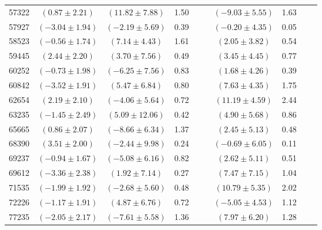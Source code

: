 \documentclass [10pt, twoside] {uwthesis}[2012/04/02]
\begin{document}
{\begin{longtable}[t]{|c|c|cccc|cccc|}
57322	&  $(	0.87	  \pm  	2.21	)$  &  $(	11.82	  \pm  	7.88	)$  &  	1.50	  &  		  &  		  &  $(	-9.03	  \pm  	5.55	)$  &  	1.63	  &  		  &  		  \\
57927	&  $(	-3.04	  \pm  	1.94	)$  &  $(	-2.19	  \pm  	5.69	)$  &  	0.39	  &  		  &  		  &  $(	-0.20	  \pm  	4.35	)$  &  	0.05	  &  		  &  		  \\
58523	&  $(	-0.56	  \pm  	1.74	)$  &  $(	7.14	  \pm  	4.43	)$  &  	1.61	  &  		  &  		  &  $(	2.05	  \pm  	3.82	)$  &  	0.54	  &  		  &  		  \\
59445	&  $(	2.44	  \pm  	2.20	)$  &  $(	3.70	  \pm  	7.56	)$  &  	0.49	  &  		  &  		  &  $(	3.45	  \pm  	4.45	)$  &  	0.77	  &  		  &  		  \\
60252	&  $(	-0.73	  \pm  	1.98	)$  &  $(	-6.25	  \pm  	7.56	)$  &  	0.83	  &  		  &  		  &  $(	1.68	  \pm  	4.26	)$  &  	0.39	  &  		  &  		  \\
60842	&  $(	-3.52	  \pm  	1.91	)$  &  $(	5.47	  \pm  	6.84	)$  &  	0.80	  &  		  &  		  &  $(	7.63	  \pm  	4.35	)$  &  	1.75	  &  		  &  		  \\
62654	&  $(	2.19	  \pm  	2.10	)$  &  $(	-4.06	  \pm  	5.64	)$  &  	0.72	  &  		  &  		  &  $(	11.19	  \pm  	4.59	)$  &  	2.44	  &  		  &  		  \\
63235	&  $(	-1.45	  \pm  	2.49	)$  &  $(	5.09	  \pm  	12.06	)$  &  	0.42	  &  		  &  		  &  $(	4.90	  \pm  	5.68	)$  &  	0.86	  &  		  &  		  \\
65665	&  $(	0.86	  \pm  	2.07	)$  &  $(	-8.66	  \pm  	6.34	)$  &  	1.37	  &  		  &  		  &  $(	2.45	  \pm  	5.13	)$  &  	0.48	  &  		  &  		  \\
68390	&  $(	3.51	  \pm  	2.00	)$  &  $(	-2.44	  \pm  	9.98	)$  &  	0.24	  &  		  &  		  &  $(	-0.69	  \pm  	6.05	)$  &  	0.11	  &  		  &  		  \\
69237	&  $(	-0.94	  \pm  	1.67	)$  &  $(	-5.08	  \pm  	6.16	)$  &  	0.82	  &  		  &  		  &  $(	2.62	  \pm  	5.11	)$  &  	0.51	  &  		  &  		  \\
69612	&  $(	-3.36	  \pm  	2.38	)$  &  $(	1.92	  \pm  	7.14	)$  &  	0.27	  &  		  &  		  &  $(	7.47	  \pm  	7.15	)$  &  	1.04	  &  		  &  		  \\
71535	&  $(	-1.99	  \pm  	1.92	)$  &  $(	-2.68	  \pm  	5.60	)$  &  	0.48	  &  		  &  		  &  $(	10.79	  \pm  	5.35	)$  &  	2.02	  &  		  &  		  \\
72226	&  $(	-1.17	  \pm  	1.91	)$  &  $(	4.87	  \pm  	6.76	)$  &  	0.72	  &  		  &  		  &  $(	-5.05	  \pm  	4.53	)$  &  	1.12	  &  		  &  		  \\
77235	&  $(	-2.05	  \pm  	2.17	)$  &  $(	-7.61	  \pm  	5.58	)$  &  	1.36	  &  		  &  		  &  $(	7.97	  \pm  	6.20	)$  &  	1.28	  &  		  &  		  \\

\end{longtable}}
\end{document}
